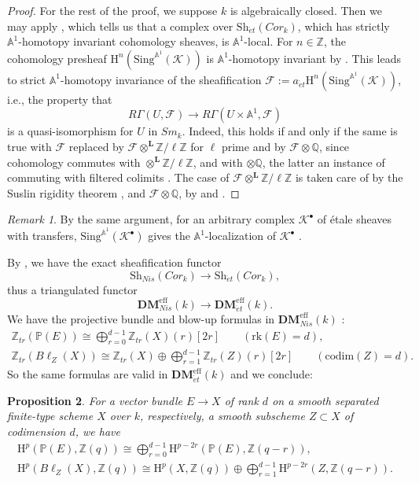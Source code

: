 \documentclass[12pt,reqno]{amsart}
\theoremstyle{plain}
\newtheorem{prop}{Proposition}[section]
\theoremstyle{remark}
\newtheorem{rema}[prop]{Remark}
\theoremstyle{definition}
\numberwithin{equation}{section}
\newcommand{\A}{{\mathbb A}}
\newcommand{\bP}{{\mathbb P}}
\newcommand{\cF}{{\mathcal F}}
\newcommand{\cK}{{\mathcal K}}
\newcommand{\rH}{{\mathrm H}}
\newcommand{\bA}{{\mathbb A}}
\newcommand{\bQ}{{\mathbb Q}}
\newcommand{\bZ}{{\mathbb Z}}
\begin{document}
\begin{proof}
For the rest of the proof, we suppose $k$ is algebraically closed.
Then we may apply \cite[Prop.\ 9.30]{weibel}, which tells us that a complex over $\mathrm{Sh}_{\acute et}(Cor_k)$, which has strictly $\A^1$-homotopy invariant cohomology sheaves, is $\A^1$-local.
For $n\in \bZ$,
the cohomology presheaf $\rH^n(\mathrm{Sing}^{\bA^1}(\cK))$ is
$\A^1$-homotopy invariant by \cite[Cor.\ 2.19]{weibel}.
This leads to strict $\A^1$-homotopy invariance of the sheafification $\cF:=a_{\acute et}\rH^n(\mathrm{Sing}^{\bA^1}(\cK))$, i.e., the property that
\[ R\Gamma(U,\cF)\to R\Gamma(U\times \A^1,\cF) \]
is a quasi-isomorphism
for $U$ in $Sm_k$.
Indeed, this holds if and only if the same is true with $\cF$ replaced by $\cF\otimes^{\mathbf{L}}\bZ/\ell\bZ$ for $\ell$ prime and by $\cF\otimes \bQ$, since cohomology commutes with $\otimes^{\mathbf{L}}\bZ/\ell\bZ$, and with $\otimes\bQ$, the latter an instance of commuting with filtered colimits \cite[Rmk.\ III.3.6]{milne}.
The case of $\cF\otimes^{\mathbf{L}}\bZ/\ell\bZ$ is taken care of by the Suslin rigidity theorem \cite[Thm.\ 7.20]{weibel}, and $\cF\otimes \bQ$, by \cite[Cor.\ 14.22]{weibel} and \cite[Thm.\ 5.6, Prop.\ 5.27]{voevodcohomological}.
\end{proof}

\begin{rema}
\label{rem.SuslinVoevodskyofcomplex}
By the same argument, for an arbitrary complex $\cK^\bullet$ of \'etale sheaves with transfers,
$\mathrm{Sing}^{\bA^1}(\cK^\bullet)$ gives the $\A^1$-localization of $\cK^\bullet$ \cite[Cor.\ 4.11]{ayoub}.
\end{rema}

By \cite[Prop.\ 3.3.1]{voevodtriangulated}, we have the exact
sheafification functor 
$$
\mathrm{Sh}_{Nis}(Cor_k)\to \mathrm{Sh}_{\acute et}(Cor_k),
$$
thus a triangulated functor
\[ \mathbf{DM}_{Nis}^{\mathrm{eff}}(k)\to \mathbf{DM}_{\acute et}^{\mathrm{eff}}(k). \]
We have the projective bundle and blow-up formulas in $\mathbf{DM}_{Nis}^{\mathrm{eff}}(k)$ \cite[Thm.\ 15.12, Cor.\ 15.13]{weibel}:
\begin{gather*}
\bZ_{tr}(\bP(E))\cong \bigoplus_{r=0}^{d-1} \bZ_{tr}(X)(r)[2r]\qquad (\mathrm{rk}(E)=d), \\
\bZ_{tr}(B\ell_Z(X))\cong \bZ_{tr}(X)\oplus\bigoplus_{r=1}^{d-1} \bZ_{tr}(Z)(r)[2r]\qquad (\mathrm{codim}(Z)=d).
\end{gather*}
So the same formulas are valid in $\mathbf{DM}_{\acute et}^{\mathrm{eff}}(k)$ and we conclude:

\begin{prop}
\label{prop.blowup}
For a vector bundle $E\to X$ of rank $d$
on a smooth separated finite-type scheme $X$ over $k$,
respectively, a smooth subscheme $Z\subset X$ of codimension $d$,  we have
\begin{gather*}
\rH^p(\bP(E),\bZ(q)) \cong \bigoplus_{r=0}^{d-1}\rH^{p-2r}(\bP(E),\bZ(q-r)),\\
\rH^p(B\ell_Z(X),\bZ(q)) \cong \rH^p(X,\bZ(q))\oplus \bigoplus_{r=1}^{d-1} \rH^{p-2r}(Z,\bZ(q-r)).
\end{gather*}
\end{prop}
\end{document}
